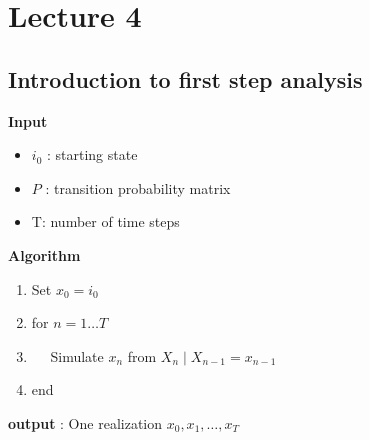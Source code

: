 \documentclass{article}
\theoremstyle{remark}
\begin{document}
\newpage

\section{Lecture 4}%
\label{sec:lecture_4}

 \subsection{Introduction to first step analysis}%
 \label{sub:introduction_to_first_step_analysis}

 \textbf{Input} 
 \begin{itemize}
   \item $i_{0}$ : starting state
    \item $P$ : transition probability matrix
    \item T: number of time steps
 \end{itemize}
 \textbf{Algorithm} 
 \begin{enumerate}
   \item Set $x_{0} = i_{0}$
   \item for $n=1 \ldots T$
   \item $\quad   $ Simulate $x_{n}$ from $X_{n}  \mid  X_{n-1} = x_{n-1}$
   \item end
 \end{enumerate}
 
 \textbf{output} : One realization $x_{0}, x_{1} , \ldots, x_{T}$ 
 
\end{document}
